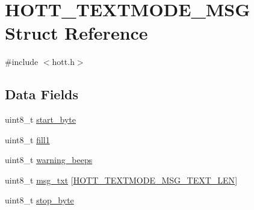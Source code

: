 \hypertarget{structHOTT__TEXTMODE__MSG}{\section{H\+O\+T\+T\+\_\+\+T\+E\+X\+T\+M\+O\+D\+E\+\_\+\+M\+S\+G Struct Reference}
\label{structHOTT__TEXTMODE__MSG}
}


{\ttfamily \#include $<$hott.\+h$>$}

\subsection*{Data Fields}
\begin{DoxyCompactItemize}
\item 
uint8\+\_\+t \hyperlink{structHOTT__TEXTMODE__MSG_a8a08a5ccb5ebdbd7c91aa1b5402df6c0}{start\+\_\+byte}
\item 
uint8\+\_\+t \hyperlink{structHOTT__TEXTMODE__MSG_a644165634beb474c254a4319d9a7163e}{fill1}
\item 
uint8\+\_\+t \hyperlink{structHOTT__TEXTMODE__MSG_abf553e7ad0aedcc9f8311b5555f54b3b}{warning\+\_\+beeps}
\item 
uint8\+\_\+t \hyperlink{structHOTT__TEXTMODE__MSG_a5b21de78098b4fef07bc6a994627464f}{msg\+\_\+txt} \mbox{[}\hyperlink{telemetry_2hott_8h_aae1017711000b3fb28075c0a8d47db26}{H\+O\+T\+T\+\_\+\+T\+E\+X\+T\+M\+O\+D\+E\+\_\+\+M\+S\+G\+\_\+\+T\+E\+X\+T\+\_\+\+L\+E\+N}\mbox{]}
\item 
uint8\+\_\+t \hyperlink{structHOTT__TEXTMODE__MSG_a79180dfc90515e90294bbe9536c1476c}{stop\+\_\+byte}
\end{DoxyCompactItemize}


